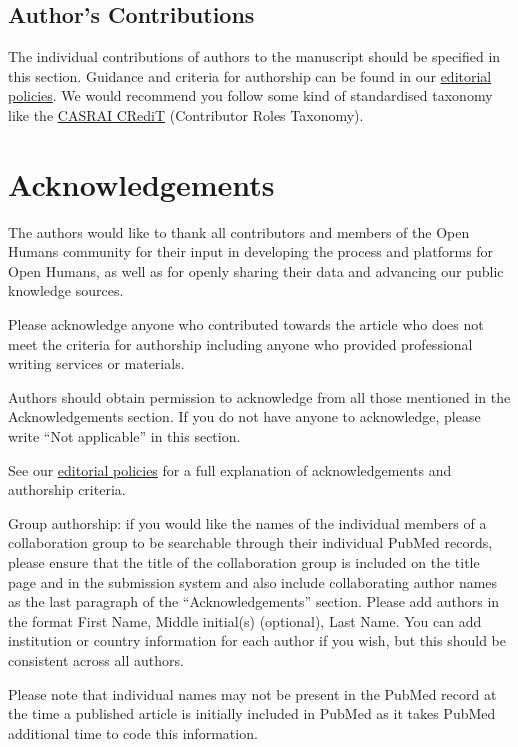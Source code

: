 \documentclass[a4paper,num-refs]{oup-contemporary}
\begin{document}
\subsection{Author's Contributions}

The individual contributions of authors to the manuscript should be specified in this section. Guidance and criteria for authorship can be found in our \href{https://academic.oup.com/gigascience/pages/editorial_policies_and_reporting_standards}{editorial policies}. We would recommend you follow some kind of standardised taxonomy like the \href{http://docs.casrai.org/CRediT}{CASRAI CRediT} (Contributor Roles Taxonomy).


\section{Acknowledgements}
The authors would like to thank all contributors and members of the Open Humans community for their input in developing the process and platforms for Open Humans, as well as for openly sharing their data and advancing our public knowledge sources.

Please acknowledge anyone who contributed towards the article who does not meet the criteria for authorship including anyone who provided professional writing services or materials.

Authors should obtain permission to acknowledge from all those mentioned in the Acknowledgements section. If you do not have anyone to acknowledge, please write ``Not applicable'' in this section.

See our \href{https://academic.oup.com/gigascience/pages/editorial_policies_and_reporting_standards}{editorial policies} for a full explanation of acknowledgements and authorship criteria.

Group authorship: if you would like the names of the individual members of a collaboration group to be searchable through their individual PubMed records, please ensure that the title of the collaboration group is included on the title page and in the submission system and also include collaborating author names as the last paragraph of the “Acknowledgements” section. Please add authors in the format First Name, Middle initial(s) (optional), Last Name. You can add institution or country information for each author if you wish, but this should be consistent across all authors.

Please note that individual names may not be present in the PubMed record at the time a published article is initially included in PubMed as it takes PubMed additional time to code this information.
\end{document}
